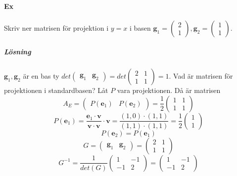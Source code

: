 \paragraph{Ex} Skriv ner matrisen för projektion i $y=x$ i basen $\bm{g}_1=\begin{pmatrix}2\\1\end{pmatrix},\bm{g}_2=\begin{pmatrix}1\\1\end{pmatrix}$.
\subparagraph{Lösning} $\bm{g}_1,\bm{g}_2$ är en bas ty 
$det\begin{pmatrix}\bm{g}_1&\bm{g}_2\end{pmatrix}=det\begin{pmatrix}2&1\\1&1\end{pmatrix}=1$.
Vad är matrisen för projektionen i standardbasen?
Låt $P$ vara projektionen.
Då är matrisen 
\begin{equation*}
    A_E=\begin{pmatrix}P(\bm{e}_1)&P(\bm{e}_2)\end{pmatrix}=\frac{1}{2}\begin{pmatrix}1&1\\1&1\end{pmatrix}
\end{equation*}
\begin{equation*}
    P(\bm{e}_1)=\frac{\bm{e}_1\cdot \bm{v}}{\bm{v}\cdot \bm{v}}\cdot\bm{v}=\frac{(1,0)\cdot (1,1)}{(1,1)\cdot (1,1)}=\frac{1}{2}\begin{pmatrix}1\\1\end{pmatrix}
\end{equation*}
\begin{equation*}
    P(\bm{e}_2)=P(\bm{e}_1)
\end{equation*}
\begin{equation*}
    G=\begin{pmatrix}\bm{g}_1 & \bm{g}_2\end{pmatrix}=\begin{pmatrix}2&1\\1&1\end{pmatrix}
\end{equation*}
\begin{equation*}
    G^{-1}=\frac{1}{det(G)}\begin{pmatrix}1&-1\\-1&2\end{pmatrix}=\begin{pmatrix}1&-1\\-1&2\end{pmatrix}
\end{equation*}
